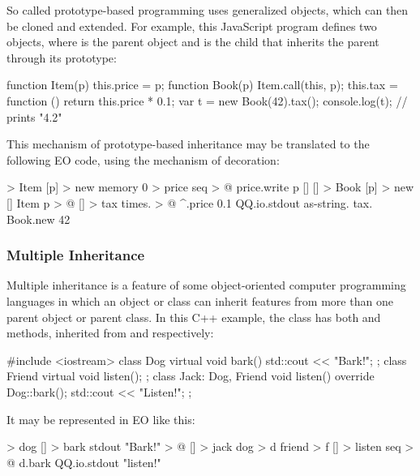 \documentclass[sigplan,11pt,nonacm,natbib=false]{acmart}
\begin{document}
So called pro\-to\-type-based programming uses generalized objects, which can then be cloned and extended. For example, this JavaScript program defines two objects, where  is the parent object and  is the child that inherits the parent through its prototype:

\begin{ffcode}
function Item(p) { this.price = p; }
function Book(p) { 
  Item.call(this, p);
  this.tax = function () {
    return this.price * 0.1;
  }
}
var t = new Book(42).tax();
console.log(t); // prints "4.2"
\end{ffcode}

This mechanism of prototype-based inheritance may be translated to the following EO code, using the mechanism of decoration:

\begin{ffcode}
[] > Item
  [p] > new
    memory 0 > price
    seq > @
      price.write p 
      []
[] > Book
  [p] > new
    []
      Item p > @
      [] > tax
        times. > @
          ^.price
          0.1
QQ.io.stdout
  as-string.
    tax.
      Book.new 42
\end{ffcode}

\subsubsection{Multiple Inheritance}

Multiple inheritance is a feature of some object-oriented computer programming languages in which an object or class can inherit features from more than one parent object or parent class. In this C++ example, 
the class  has both  and  methods, inherited from  and  respectively:

\begin{ffcode}
#include <iostream>
class Dog {
  virtual void bark() { 
    std::cout << "Bark!"; 
  }
};
class Friend {
  virtual void listen();
};
class Jack: Dog, Friend {
  void listen() override { 
    Dog::bark();
    std::cout << "Listen!"; 
  }
};
\end{ffcode}

It may be represented in EO like this:

\begin{ffcode}
[] > dog
  [] > bark
    stdout "Bark!" > @
[] > jack
  dog > d
  friend > f
  [] > listen
    seq > @
      d.bark
      QQ.io.stdout "listen!"
\end{ffcode}
\end{document}
